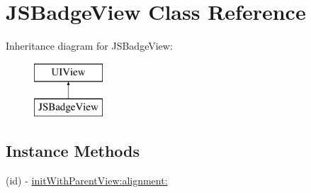 \hypertarget{interface_j_s_badge_view}{}\section{J\+S\+Badge\+View Class Reference}
\label{interface_j_s_badge_view}
Inheritance diagram for J\+S\+Badge\+View\+:\begin{figure}[H]
\begin{center}
\leavevmode
\includegraphics[height=2.000000cm]{interface_j_s_badge_view}
\end{center}
\end{figure}
\subsection*{Instance Methods}
\begin{DoxyCompactItemize}
\item 
(id) -\/ \hyperlink{interface_j_s_badge_view_a279e163d5d4d0c4d2327ebd47d378aca}{init\+With\+Parent\+View\+:alignment\+:}
\end{DoxyCompactItemize}
